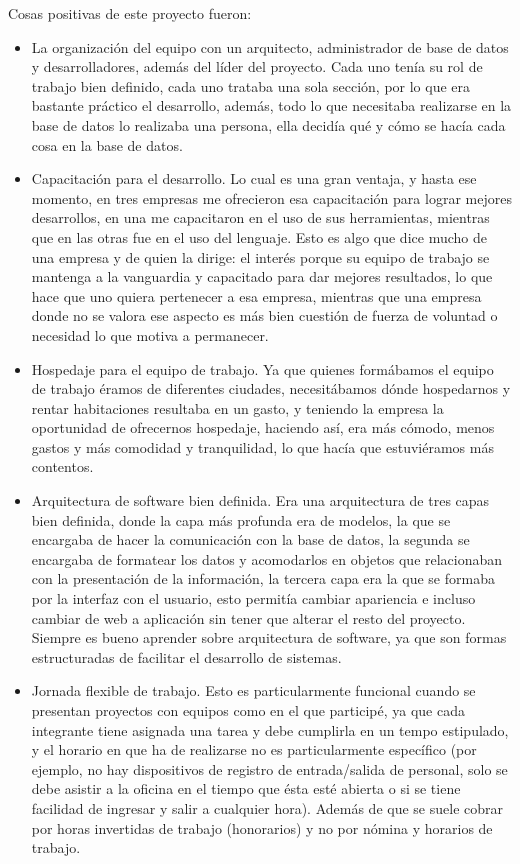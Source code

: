 \documentclass[12pt,spanish,lettersize]{book}
\begin{document}
Cosas positivas de este proyecto fueron: 
\begin{itemize}
\item La organización del equipo con un arquitecto, administrador de base de datos y desarrolladores, además del líder del proyecto. Cada uno tenía su rol de trabajo bien definido, cada uno trataba una sola sección, por lo que era bastante práctico el desarrollo, además, todo lo que necesitaba realizarse en la base de datos lo realizaba una persona, ella decidía qué y cómo se hacía cada cosa en la base de datos. 
\item Capacitación para el desarrollo. Lo cual es una gran ventaja, y hasta ese momento, en tres empresas me ofrecieron esa capacitación para lograr mejores desarrollos, en una me capacitaron en el uso de sus herramientas, mientras que en las otras fue en el uso del lenguaje. Esto es algo que dice mucho de una empresa y de quien la dirige: el interés porque su equipo de trabajo se mantenga a la vanguardia y capacitado para dar mejores resultados, lo que hace que uno quiera pertenecer a esa empresa, mientras que una empresa donde no se valora ese aspecto es más bien cuestión de fuerza de voluntad o necesidad lo que motiva a permanecer. 
\item Hospedaje para el equipo de trabajo. Ya que quienes formábamos el equipo de trabajo éramos de diferentes ciudades, necesitábamos dónde hospedarnos y rentar habitaciones resultaba en un gasto, y teniendo la empresa la oportunidad de ofrecernos hospedaje, haciendo así, era más cómodo, menos gastos y más comodidad y tranquilidad, lo que hacía que estuviéramos más contentos. 
\item Arquitectura de software bien definida. Era una arquitectura de tres capas bien definida, donde la capa más profunda era de modelos, la que se encargaba de hacer la comunicación con la base de datos, la segunda se encargaba de formatear los datos y acomodarlos en objetos que relacionaban con la presentación de la información, la tercera capa era la que se formaba por la interfaz con el usuario, esto permitía cambiar apariencia e incluso cambiar de web a aplicación sin tener que alterar el resto del proyecto. Siempre es bueno aprender sobre arquitectura de software, ya que son formas estructuradas de facilitar el desarrollo de sistemas. 
\item Jornada flexible de trabajo. Esto es particularmente funcional cuando se presentan proyectos con equipos como en el que participé, ya que cada integrante tiene asignada una tarea y debe cumplirla en un tempo estipulado, y el horario en que ha de realizarse no es particularmente específico (por ejemplo, no hay dispositivos de registro de entrada/salida de personal, solo se debe asistir a la oficina en el tiempo que ésta esté abierta o si se tiene facilidad de ingresar y salir a cualquier hora). Además de que se suele cobrar por horas invertidas de trabajo (honorarios) y no por nómina y horarios de trabajo. 
\end{itemize}
\end{document}

